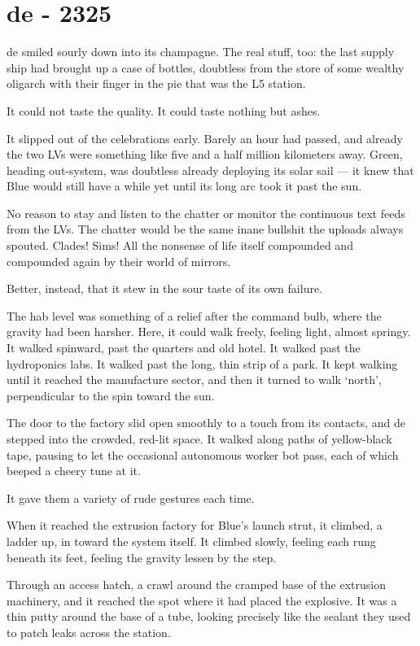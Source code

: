 \hypertarget{de—2325}{%
\chapter{de - 2325}\label{de—2325}}

de smiled sourly down into its champagne. The real stuff, too: the last supply ship had brought up a case of bottles, doubtless from the store of some wealthy oligarch with their finger in the pie that was the L5 station.

It could not taste the quality. It could taste nothing but ashes.

It slipped out of the celebrations early. Barely an hour had passed, and already the two LVs were something like five and a half million kilometers away. Green, heading out-system, was doubtless already deploying its solar sail — it knew that Blue would still have a while yet until its long arc took it past the sun.

No reason to stay and listen to the chatter or monitor the continuous text feeds from the LVs. The chatter would be the same inane bullshit the uploads always spouted. Clades! Sims! All the nonsense of life itself compounded and compounded again by their world of mirrors.

Better, instead, that it stew in the sour taste of its own failure.

The hab level was something of a relief after the command bulb, where the gravity had been harsher. Here, it could walk freely, feeling light, almost springy. It walked spinward, past the quarters and old hotel. It walked past the hydroponics labs. It walked past the long, thin strip of a park. It kept walking until it reached the manufacture sector, and then it turned to walk `north', perpendicular to the spin toward the sun.

The door to the factory slid open smoothly to a touch from its contacts, and de stepped into the crowded, red-lit space. It walked along paths of yellow-black tape, pausing to let the occasional autonomous worker bot pass, each of which beeped a cheery tune at it.

It gave them a variety of rude gestures each time.

When it reached the extrusion factory for Blue's launch strut, it climbed, a ladder up, in toward the system itself. It climbed slowly, feeling each rung beneath its feet, feeling the gravity lessen by the step.

Through an access hatch, a crawl around the cramped base of the extrusion machinery, and it reached the spot where it had placed the explosive. It was a thin putty around the base of a tube, looking precisely like the sealant they used to patch leaks across the station.

